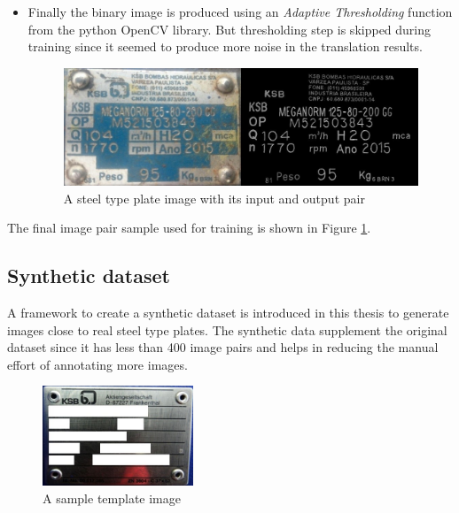 \begin{itemize}
\item Finally the binary image is produced using an \textit{Adaptive Thresholding} function from the python OpenCV library. But thresholding step is skipped during training since it seemed to produce more noise in the translation results.

\begin{figure}[H]
\centering
\includegraphics[width=5in]{images/imagepair.jpg}
\caption{A steel type plate image with its input and output pair}
\label{fig:imgpair}
\end{figure}
\end{itemize}

	The final image pair sample used for training is shown in Figure \ref{fig:imgpair}.
\subsection{Synthetic dataset}
A framework to create a synthetic dataset is introduced in this thesis to generate images close to real steel type plates. The synthetic data supplement the original dataset since it has less than 400 image pairs and helps in reducing the manual effort of annotating more images.
\newline
\begin{figure}
\centering
\includegraphics[width=0.4\textwidth]{images/template.jpg}
\caption{A sample template image}
\label{fig:template}
\end{figure}

